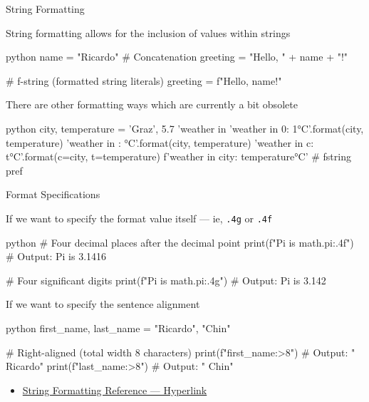 \documentclass[
	11pt, 
]{beamer}
\begin{document}
\begin{frame}[fragile]{String Formatting}

String formatting allows for the inclusion of values within strings

\begin{mintedbox}{python}
name = "Ricardo"     
# Concatenation
greeting = "Hello, " + name + "!"

# f-string (formatted string literals)
greeting = f"Hello, {name}!"
\end{mintedbox}

There are other formatting ways which are currently a bit obsolete

\begin{mintedbox}{python}
city, temperature = 'Graz', 5.7    
'weather in %
'weather in {0}: {1}°C'.format(city, temperature)
'weather in {}: {}°C'.format(city, temperature)
'weather in {c}: {t}°C'.format(c=city, t=temperature)
f'weather in {city}: {temperature}°C' # fstring pref
\end{mintedbox}

\end{frame}


\begin{frame}[fragile]{Format Specifications}

If we want to specify the format value itself --- ie, \texttt{.4g} or \texttt{.4f}

\begin{mintedbox}{python}
# Four decimal places after the decimal point
print(f"Pi is {math.pi:.4f}") # Output: Pi is 3.1416

# Four significant digits
print(f"Pi is {math.pi:.4g}") # Output: Pi is 3.142
\end{mintedbox}

If we want to specify the sentence alignment

\begin{mintedbox}{python}
first_name, last_name = "Ricardo", "Chin"

# Right-aligned (total width 8 characters)
print(f"{first_name:>8}")  # Output: " Ricardo"
print(f"{last_name:>8}")   # Output: "    Chin"
\end{mintedbox}

\begin{itemize}
    \item \href{https://mkaz.blog/working-with-python/string-formatting/}{String Formatting Reference --- Hyperlink}
\end{itemize}

\end{frame}
\end{document}
